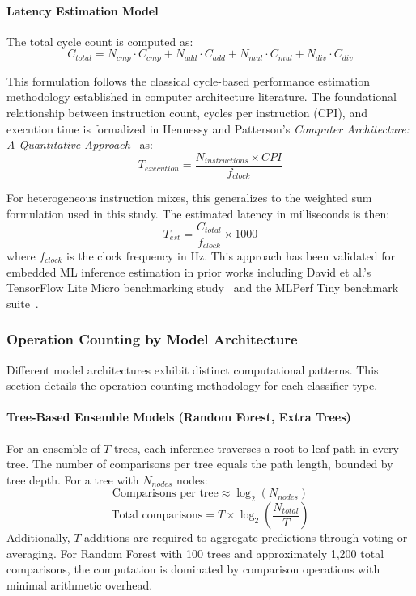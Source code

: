 \paragraph{Latency Estimation Model}
The total cycle count is computed as:
\begin{equation}
    C_{total} = N_{cmp} \cdot C_{cmp} + N_{add} \cdot C_{add} + N_{mul} \cdot C_{mul} + N_{div} \cdot C_{div}
\end{equation}

This formulation follows the classical cycle-based performance estimation methodology established in computer architecture literature. The foundational relationship between instruction count, cycles per instruction (CPI), and execution time is formalized in Hennessy and Patterson's \textit{Computer Architecture: A Quantitative Approach}~\cite{hennessy2017computer} as:
\begin{equation}
    T_{execution} = \frac{N_{instructions} \times CPI}{f_{clock}}
\end{equation}

For heterogeneous instruction mixes, this generalizes to the weighted sum formulation used in this study. The estimated latency in milliseconds is then:
\begin{equation}
    T_{est} = \frac{C_{total}}{f_{clock}} \times 1000
\end{equation}
where $f_{clock}$ is the clock frequency in Hz. This approach has been validated for embedded ML inference estimation in prior works including David et al.'s TensorFlow Lite Micro benchmarking study~\cite{david2021tensorflow} and the MLPerf Tiny benchmark suite~\cite{banbury2021mlperf}.

\subsubsection{Operation Counting by Model Architecture}

Different model architectures exhibit distinct computational patterns. This section details the operation counting methodology for each classifier type.

\paragraph{Tree-Based Ensemble Models (Random Forest, Extra Trees)}
For an ensemble of $T$ trees, each inference traverses a root-to-leaf path in every tree. The number of comparisons per tree equals the path length, bounded by tree depth. For a tree with $N_{nodes}$ nodes:
\begin{equation}
    \text{Comparisons per tree} \approx \log_2(N_{nodes})
\end{equation}
\begin{equation}
    \text{Total comparisons} = T \times \log_2\left(\frac{N_{total}}{T}\right)
\end{equation}
Additionally, $T$ additions are required to aggregate predictions through voting or averaging. For Random Forest with 100 trees and approximately 1,200 total comparisons, the computation is dominated by comparison operations with minimal arithmetic overhead.

